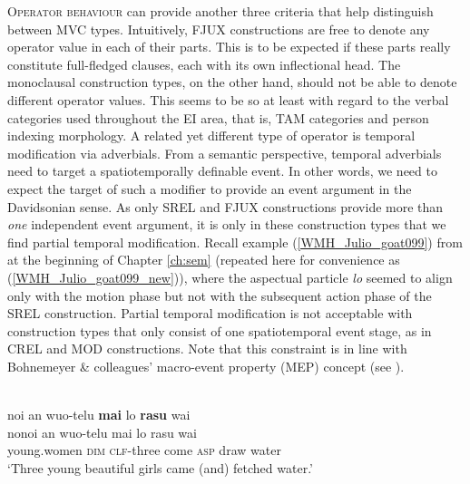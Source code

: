 \textsc{Operator behaviour} can provide another three criteria that help distinguish between MVC types. Intuitively, FJUX constructions are free to denote any operator value in each of their parts. This is to be expected if these parts really constitute full-fledged clauses, each with its own inflectional head. The monoclausal construction types, on the other hand, should not be able to denote different operator values. This seems to be so at least with regard to the verbal categories used throughout the EI area, that is, TAM categories and person indexing morphology. A related yet different type of operator is temporal modification via adverbials. From a semantic perspective, temporal adverbials need to target a spatiotemporally definable event. In other words, we need to expect the target of such a modifier to provide an event argument in the Davidsonian sense. As only SREL and FJUX constructions provide more than \emph{one} independent event argument, it is only in these construction types that we find partial temporal modification. Recall example (\ref{WMH_Julio_goat099}) from  at the beginning of Chapter \ref{ch:sem} (repeated here for convenience as (\ref{WMH_Julio_goat099_new})), where the aspectual particle \textit{lo} seemed to align only with the motion phase but not with the subsequent action phase of the SREL construction. Partial temporal modification is not acceptable with construction types that only consist of one spatiotemporal event stage, as in CREL and MOD constructions. Note that this constraint is in line with Bohnemeyer \& colleagues' macro-event property (MEP) concept (see \citealt{bohnemeyer2007principles, bohnemeyer2011}).

\ea \label{WMH_Julio_goat099_new}
\\
\glll noi an wuo-telu \textbf{mai} lo \textbf{rasu} wai \\
nonoi an wuo-telu mai lo rasu wai \\
young.women \textsc{dim} \textsc{clf}-three come \textsc{asp} draw water\\
\glft `Three young beautiful girls came (and) fetched water.'\\ 
\z

